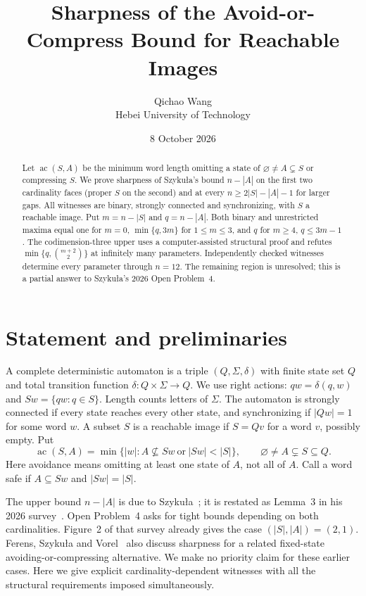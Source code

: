 \documentclass[10pt]{article}
\title{Sharpness of the Avoid-or-Compress Bound for Reachable Images}
\author{Qichao Wang\\Hebei University of Technology}
\date{8 October 2026}
\newcommand{\ac}{\operatorname{ac}}
\begin{document}
\maketitle
\begin{abstract}
Let $\ac(S,A)$ be the minimum word length omitting a state of $\varnothing\ne A\subsetneq S$ or compressing $S$. We prove sharpness of Szyku\l a's bound $n-|A|$ on the first two cardinality faces (proper $S$ on the second) and at every $n\ge2|S|-|A|-1$ for larger gaps. All witnesses are binary, strongly connected and synchronizing, with $S$ a reachable image. Put $m=n-|S|$ and $q=n-|A|$. Both binary and unrestricted maxima equal one for $m=0$, $\min\{q,3m\}$ for $1\le m\le3$, and $q$ for $m\ge4$, $q\le3m-1$. The codimension-three upper uses a computer-assisted structural proof and refutes $\min\{q,\binom{m+2}{2}\}$ at infinitely many parameters. Independently checked witnesses determine every parameter through $n=12$. The remaining region is unresolved; this is a partial answer to Szyku\l a's 2026 Open Problem~4.
\end{abstract}

\section{Statement and preliminaries}
A complete deterministic automaton is a triple $(Q,\Sigma,\delta)$ with finite state set $Q$ and total transition function $\delta:Q\times\Sigma\to Q$. We use right actions: $qw=\delta(q,w)$ and $Sw=\{qw:q\in S\}$. Length counts letters of $\Sigma$. The automaton is strongly connected if every state reaches every other state, and synchronizing if $|Qw|=1$ for some word $w$. A subset $S$ is a reachable image if $S=Qv$ for a word $v$, possibly empty. Put
\[
 \ac(S,A)=\min\{|w|: A\nsubseteq Sw\ \text{or}\ |Sw|<|S|\},
 \qquad \varnothing\ne A\subsetneq S\subseteq Q.
\]
Here avoidance means omitting at least one state of $A$, not all of $A$. Call a word safe if $A\subseteq Sw$ and $|Sw|=|S|$.

The upper bound $n-|A|$ is due to Szyku\l a~\cite[Lemma~2]{szykula2018}; it is restated as Lemma~3 in his 2026 survey~\cite{szykula2026}. Open Problem~4 asks for tight bounds depending on both cardinalities. Figure~2 of that survey already gives the case $(|S|,|A|)=(2,1)$. Ferens, Szyku\l a and Vorel~\cite[p.~46:6]{ferens2021} also discuss sharpness for a related fixed-state avoiding-or-compressing alternative. We make no priority claim for these earlier cases. Here we give explicit cardinality-dependent witnesses with all the structural requirements imposed simultaneously.
\end{document}
